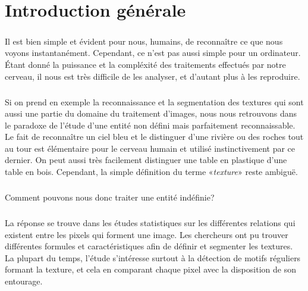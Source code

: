 
\chapter*{Introduction générale}

\label{Chapter0} %





\paragraph*{}
Il est bien simple et évident pour nous, humains, de reconnaître ce que nous voyons instantanément.  Cependant, ce n'est pas aussi simple pour un ordinateur. Étant donné la puissance et la compléxité des traitements effectués par notre cerveau, il nous est très difficile de les analyser, et d'autant plus à les reproduire. 

\paragraph*{}
Si on prend en exemple la reconnaissance et la segmentation des textures qui sont aussi une partie du domaine du traitement d’images, nous nous retrouvons dans le paradoxe de l’étude d’une entité non défini mais parfaitement reconnaissable. Le fait de reconnaître un ciel bleu et le distinguer d’une rivière ou des roches tout au tour est élémentaire pour le cerveau humain et utilisé instinctivement par ce dernier. On peut aussi très facilement distinguer une table en plastique d’une table en bois. Cependant, la simple définition du  terme «\textit{texture}» reste ambiguë. 

\paragraph*{}
Comment pouvons nous donc traiter une entité indéfinie?

\paragraph*{}
La réponse se trouve dans les études statistiques sur les différentes relations qui existent entre les pixels qui forment une image.
Les chercheurs ont pu trouver différentes formules et caractéristiques afin de définir et segmenter les textures. La plupart du temps, l'étude s'intéresse surtout à la détection de motifs réguliers formant la texture, et cela en comparant chaque pixel avec la disposition de son entourage.

